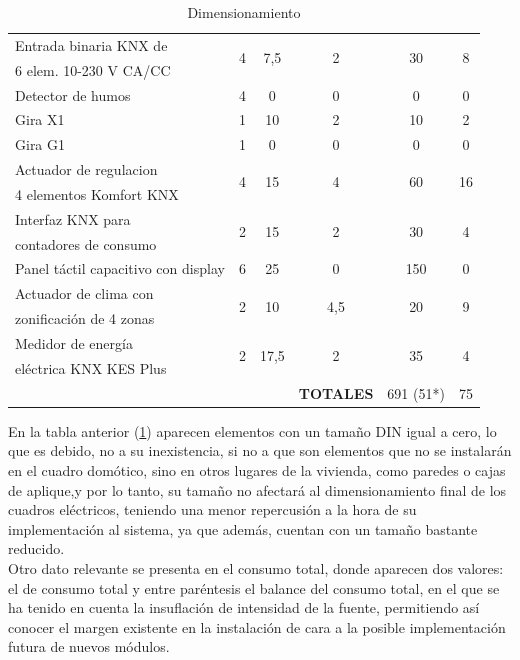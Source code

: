 \begin{flushleft}
\begin{table}[H]
\begin{tabular}{|p{4cm}|c|c|c|c|c|}
\hline
\rule[0mm]{0mm}{4mm}
Entrada binaria KNX de &  \multirow{2}{*}{4} &  \multirow{2}{*}{7,5} &  \multirow{2}{*}{2} &  \multirow{2}{*}{30} &  \multirow{2}{*}{8}\\
 6 elem. 10-230 V CA/CC & & & & &\\
\hline
\rule[0mm]{0mm}{4mm}
 Detector de humos & 4 & 0  & 0 & 0 & 0\\
\hline
\rule[0mm]{0mm}{4mm}
Gira X1 & 1 & 10 & 2 & 10 & 2\\
\hline
\rule[0mm]{0mm}{4mm}
Gira G1 & 1 & 0 & 0 & 0 & 0\\
\hline
\rule[0mm]{0mm}{4mm}
Actuador de regulacion  &  \multirow{2}{*}{4} &  \multirow{2}{*}{15} &  \multirow{2}{*}{4} &  \multirow{2}{*}{60} &  \multirow{2}{*}{16}\\
4 elementos Komfort KNX & & & & &\\
\hline
\rule[0mm]{0mm}{4mm}
Interfaz KNX para &  \multirow{2}{*}{2} &  \multirow{2}{*}{15} &  \multirow{2}{*}{2} & \multirow{2}{*}{30} & \multirow{2}{*}{4}\\
contadores de consumo  & & & & &\\
\hline
\rule[0mm]{0mm}{4mm}
Panel táctil capacitivo con display & 6 & 25 & 0 & 150 & 0\\
\hline
\rule[0mm]{0mm}{4mm}
Actuador de clima con &\multirow{2}{*}{2} & \multirow{2}{*}{10} & \multirow{2}{*}{4,5} & \multirow{2}{*}{20} & \multirow{2}{*}{9}\\
zonificación de 4 zonas   & & & & &\\
\hline
\rule[0mm]{0mm}{4mm}
Medidor de energía  & \multirow{2}{*}{2} & \multirow{2}{*}{17,5} & \multirow{2}{*}{2} & \multirow{2}{*}{35} & \multirow{2}{*}{4} \\
eléctrica KNX KES Plus & & & & &\\
\hline
\hline
\rule[0mm]{0mm}{4mm}
 & & &\textbf{TOTALES}&691 (51*)&75\\
\hline
\end{tabular}
\caption{Dimensionamiento}
\label{tab:tabla_dimensionamiento}
\end{table}
\end{flushleft}
\newpage
En la tabla anterior (\ref{tab:tabla_dimensionamiento}) aparecen elementos con un tamaño DIN igual a cero, lo que es debido, no a su inexistencia, si no a que son elementos que no se instalarán en el cuadro domótico, sino en otros lugares de la vivienda, como paredes o cajas de aplique,y por lo tanto, su tamaño no afectará al dimensionamiento final de los cuadros eléctricos, teniendo una menor repercusión a la hora de su implementación al sistema, ya que además, cuentan con un tamaño bastante reducido.\\
Otro dato relevante se presenta en el consumo total, donde aparecen dos valores: el de consumo total y entre paréntesis el balance del consumo total, en el que se ha tenido en cuenta la insuflación de intensidad de la fuente, permitiendo así conocer el margen existente en la instalación de cara a la posible implementación futura de nuevos módulos.


